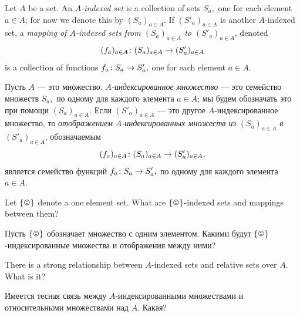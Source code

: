 \documentclass[CT4S-EN-RU]{subfiles}
\begin{document}
\begin{definitionENG}\label{def:indexed sets}
Let $A$ be a set. An {\em $A$-indexed set} is a collection of sets $S_a,$ one for each element $a\in A$; for now we denote this by $(S_a)_{a\in A}.$ If $(S'_a)_{a\in A}$ is another $A$-indexed set, a {\em mapping of $A$-indexed sets from $(S_a)_{a\in A}$ to $(S'_a)_{a\in A}$}, denoted $$(f_a)_{a\in A}\colon(S_a)_{a\in A}\rightarrow (S'_a)_{a\in A}$$ is a collection of functions $f_a\colon S_a\rightarrow S'_a,$ one for each element $a\in A.$
\end{definitionENG}

\begin{definitionRUS}\label{def:indexed sets}
Пусть $A$ — это множество. {\em $A$-индексированное множество} — это семейство множеств $S_a,$ по одному для каждого элемента $a\in A$; мы будем обозначать это при помощи $(S_a)_{a\in A}.$ Если $(S'_a)_{a\in A}$ — это другое $A$-индексированное множество, то {\em отображением $A$-индексированных множеств из $(S_a)_{a\in A}$ в $(S'_a)_{a\in A}$}, обозначаемым $$(f_a)_{a\in A}\colon(S_a)_{a\in A}\rightarrow (S'_a)_{a\in A},$$ является семейство функций $f_a\colon S_a\rightarrow S'_a,$ по одному для каждого элемента $a\in A.$
\end{definitionRUS}

\begin{exerciseENG}
Let $\singleton$ denote a one element set. What are $\singleton$-indexed sets and mappings between them?
\end{exerciseENG}

\begin{exerciseRUS}
Пусть $\singleton$ обозначает множество с одним элементом. Какими будут $\singleton$-индексированные множества и отображения между ними?
\end{exerciseRUS}

\begin{exerciseENG}
There is a strong relationship between $A$-indexed sets and relative sets over $A.$ What is it?
\end{exerciseENG}

\begin{exerciseRUS}
Имеется тесная связь между $A$-индексированными множествами и относительными множествами над $A.$ Какая?
\end{exerciseRUS}
\end{document}
